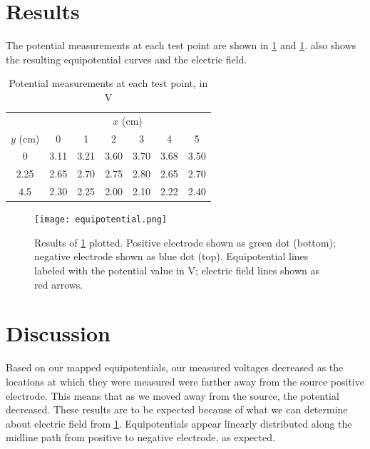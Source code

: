 ﻿\documentclass[10pt,journal,twoside]{IEEEtran}
\begin{document}
\section{Results}
The potential measurements at each test point are shown in \cref{tab:1} and \cref{fig:3}.  also shows the resulting equipotential curves and the electric field. 
\begin{table}
\caption{Potential measurements at each test point, in \unit{\volt}} 
\label{tab:1}
\begin{center}
\begin{tabular}{ccccccc}
\toprule
& \multicolumn{6}{c}{ $x$ (\unit{\centi\meter})} \\
$y$ (\unit{\centi\meter})     & 0    & 1    & 2    & 3    & 4    & 5 \\
\midrule
0    & 3.11 & 3.21 & 3.60 & 3.70 & 3.68 & 3.50 \\
2.25 & 2.65 & 2.70 & 2.75 & 2.80 & 2.65 & 2.70 \\
4.5  & 2.30 & 2.25 & 2.00 & 2.10 & 2.22 & 2.40 \\
\bottomrule
\end{tabular}
\end{center}
\end{table}
	
\begin{figure}
\begin{center}
\texttt{[image: equipotential.png]}
\end{center}
\caption{Results of \cref{tab:1} plotted. Positive electrode shown as green dot (bottom); negative electrode shown as blue dot (top). Equipotential lines labeled with the potential value in \unit{\volt}; electric field lines shown as red arrows.}
\label{fig:3}
\end{figure} 
  

          





\section{Discussion}
Based on our mapped equipotentials, our measured voltages decreased as the locations at which they were measured were farther away from the source positive electrode. This means that as we moved away from the source, the potential decreased. These results are to be expected because of what we can determine about electric field from \cref{fig:3}. Equipotentials appear linearly distributed along the midline path from positive to negative electrode, as expected. 
\end{document}
